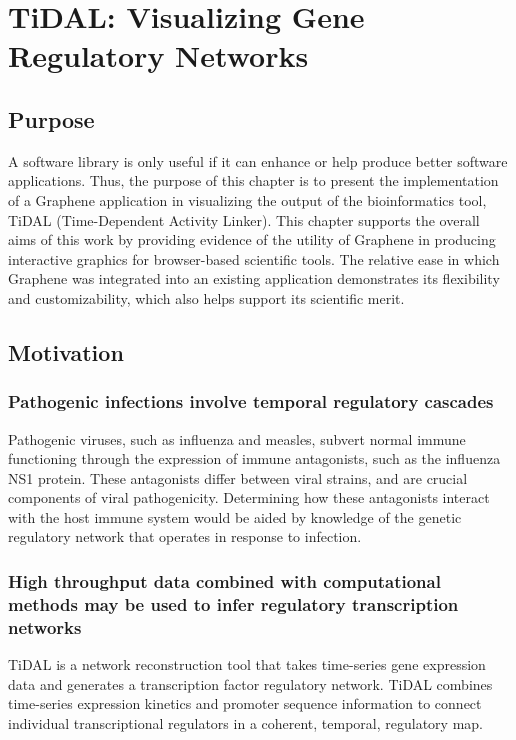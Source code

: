 \chapter{TiDAL: Visualizing Gene Regulatory Networks}
\label{chap:tidal}

\section{Purpose}

A software library is only useful if it can enhance or help produce better software applications.
Thus, the purpose of this chapter is to present the implementation of a Graphene application in visualizing the output of the bioinformatics tool, TiDAL (Time-Dependent Activity Linker).
This chapter supports the overall aims of this work by providing evidence of the utility of Graphene in producing interactive graphics for browser-based scientific tools.
The relative ease in which Graphene was integrated into an existing application demonstrates its flexibility and customizability, which also helps support its scientific merit.

\section{Motivation}
\subsection{Pathogenic infections involve temporal regulatory cascades}

Pathogenic viruses, such as influenza and measles, subvert normal immune functioning through the expression of immune antagonists, such as the influenza NS1 protein. 
These antagonists differ between viral strains, and are crucial components of viral pathogenicity. 
Determining how these antagonists interact with the host immune system would be aided by knowledge of the genetic regulatory network that operates in response to infection. 


\subsection{High throughput data combined with computational methods may be used to infer regulatory transcription networks}



TiDAL \autocite{zaslavsky2013reconstruction} is a network reconstruction tool that takes time-series gene expression data and generates a transcription factor regulatory network.
TiDAL combines time-series expression kinetics and promoter sequence information to connect individual transcriptional regulators in a coherent, temporal, regulatory map. 

